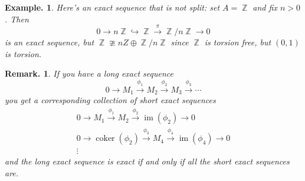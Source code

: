\documentclass[11pt, a4paper]{memoir}
\DeclareMathOperator{\Z}{{\mathbb{Z}}}
\newcommand{\fto}[1]{\ensuremath{\xrightarrow{\scriptstyle{#1}}}}
\newcommand{\hto}[0]{\ensuremath{\hookrightarrow}}
\theoremstyle{change}
\theoremstyle{plain}
\theoremstyle{nonumberplain}
\newtheorem{example}{Example.}
\newtheorem{remark}{Remark.}
\DeclareMathOperator{\coker}{coker}
\DeclareMathOperator{\im}{im}
\numberwithin{equation}{section}
\begin{document}
\begin{example}
    Here's an exact sequence that is not split: set $A=\Z$ and fix $n>0$.
    Then
    \begin{equation*}
        0\to n\Z\hto\Z\fto{\pi}\Z/n\Z\to 0
    \end{equation*}
    is an exact sequence, but $\Z\ncong nZ\oplus \Z/n\Z$ since $\Z$ is torsion free, but $(0,1)$ is torsion.
\end{example}
\begin{remark}
    If you have a long exact sequence
    \begin{equation*}
        0\to M_1\fto{\phi_1}M_2\fto{\phi_2} M_3\fto{\phi_3}\cdots
    \end{equation*}
    you get a corresponding collection of short exact sequences
    \begin{gather*}
        0\to M_1\fto{\phi_1}M_2\fto{\phi_2} \im(\phi_2)\to 0\\
        0\to\coker(\phi_2)\fto{\phi_3}M_4\fto{\phi_4}\im(\phi_4)\to 0\\
        \vdots
    \end{gather*}
    and the long exact sequence is exact if and only if all the short exact sequences are.
\end{remark}
\end{document}
